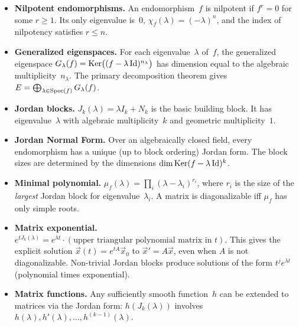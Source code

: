 \begin{itemize}
  \item \textbf{Nilpotent endomorphisms.}
    An endomorphism~$f$ is nilpotent if $f^r = 0$ for some $r \geq 1$.
    Its only eigenvalue is~$0$, $\chi_f(\lambda) = (-\lambda)^n$, and
    the index of nilpotency satisfies $r \leq n$.

  \item \textbf{Generalized eigenspaces.}
    For each eigenvalue~$\lambda$ of~$f$, the generalized eigenspace
    $G_\lambda(f) = \operatorname{Ker}\bigl((f - \lambda\operatorname{Id})^{n_\lambda}\bigr)$ has
    dimension equal to the algebraic multiplicity~$n_\lambda$.  The
    primary decomposition theorem gives
    $E = \bigoplus_{\lambda \in \operatorname{Spec}(f)} G_\lambda(f)$.

  \item \textbf{Jordan blocks.}
    $J_k(\lambda) = \lambda I_k + N_k$ is the basic building block.
    It has eigenvalue~$\lambda$ with algebraic multiplicity~$k$ and
    geometric multiplicity~$1$.

  \item \textbf{Jordan Normal Form.}
    Over an algebraically closed field, every endomorphism has a
    unique (up to block ordering) Jordan form.  The block sizes are
    determined by the dimensions $\dim\operatorname{Ker}(f - \lambda\operatorname{Id})^k$.

  \item \textbf{Minimal polynomial.}
    $\mu_f(\lambda) = \prod_{i} (\lambda - \lambda_i)^{r_i}$,
    where $r_i$ is the size of the \emph{largest} Jordan block for
    eigenvalue~$\lambda_i$.  A matrix is diagonalizable iff
    $\mu_f$ has only simple roots.

  \item \textbf{Matrix exponential.}
    $e^{tJ_k(\lambda)} = e^{\lambda t} \cdot (\text{upper triangular
    polynomial matrix in~$t$})$.  This gives the explicit solution
    $\vec{x}(t) = e^{tA}\vec{x}_0$ to $\vec{x}' = A\vec{x}$, even
    when $A$ is not diagonalizable.  Non-trivial Jordan blocks produce
    solutions of the form $t^j e^{\lambda t}$ (polynomial times
    exponential).

  \item \textbf{Matrix functions.}
    Any sufficiently smooth function~$h$ can be extended to matrices
    via the Jordan form: $h(J_k(\lambda))$ involves
    $h(\lambda), h'(\lambda), \ldots, h^{(k-1)}(\lambda)$.
\end{itemize}
